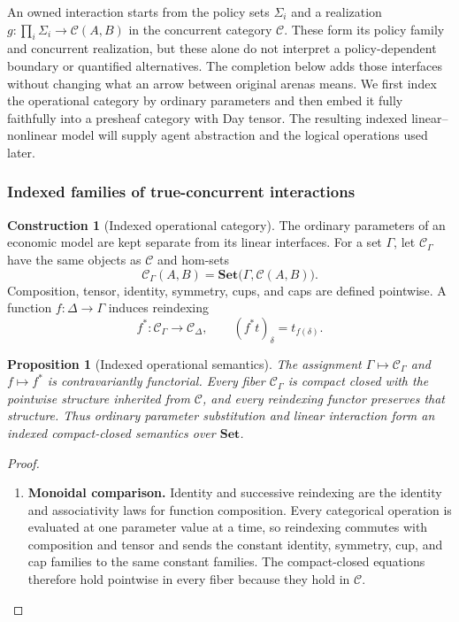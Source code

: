 \documentclass[11pt,a4paper]{article}
\numberwithin{equation}{section}
\newtheorem{proposition}[theorem]{Proposition}
\theoremstyle{definition}
\newtheorem{construction}[construction]{Construction}
\theoremstyle{remark}
\theoremstyle{plain}
\begin{document}
An owned interaction starts from the policy sets $\Sigma_i$ and a
realization $g:\prod_i\Sigma_i\to\mathcal C(A,B)$ in the concurrent
category $\mathcal C$. These form its policy family and concurrent
realization, but these alone do not interpret a policy-dependent boundary
or quantified alternatives. The completion below adds those interfaces
without changing what an arrow between original arenas means. We first
index the operational category by ordinary parameters and then embed it
fully faithfully into a presheaf category with Day tensor. The resulting
indexed linear--nonlinear model will supply agent abstraction and the
logical operations used later.

\subsubsection{Indexed families of true-concurrent interactions}

\begin{construction}[Indexed operational category]
The ordinary parameters of an economic model are kept separate from its
linear interfaces. For a set $\Gamma$, let $\mathcal C_\Gamma$ have the same
objects as $\mathcal C$ and hom-sets
\[
 \mathcal C_\Gamma(A,B)
   =\mathbf{Set}\bigl(\Gamma,\mathcal C(A,B)\bigr).
\]
Composition, tensor, identity, symmetry, cups, and caps are defined
pointwise. A function $f:\Delta\to\Gamma$ induces reindexing
\[
 f^*:\mathcal C_\Gamma\longrightarrow\mathcal C_\Delta,
 \qquad (f^*t)_\delta=t_{f(\delta)}.
\]
\end{construction}

\begin{proposition}[Indexed operational semantics]
\label{prop:egt-indexed-operational}
The assignment $\Gamma\mapsto\mathcal C_\Gamma$ and
$f\mapsto f^*$ is contravariantly functorial. Every fiber
$\mathcal C_\Gamma$ is compact closed with the pointwise structure inherited
from $\mathcal C$, and every reindexing functor preserves that structure.
Thus ordinary parameter substitution and linear interaction form an indexed
compact-closed semantics over $\mathbf{Set}$.
\end{proposition}
\begin{proof}
\leavevmode
\begin{enumerate}[label=\textup{(\arabic*)},leftmargin=*,itemsep=4pt,topsep=3pt]
  \item \textbf{Monoidal comparison.} Identity and successive reindexing are the identity and associativity laws
for function composition. Every categorical operation is evaluated at one
parameter value at a time, so reindexing commutes with composition and tensor
and sends the constant identity, symmetry, cup, and cap families to the same
constant families. The compact-closed equations therefore hold pointwise in
every fiber because they hold in $\mathcal C$.
\end{enumerate}
\end{proof}
\end{document}
